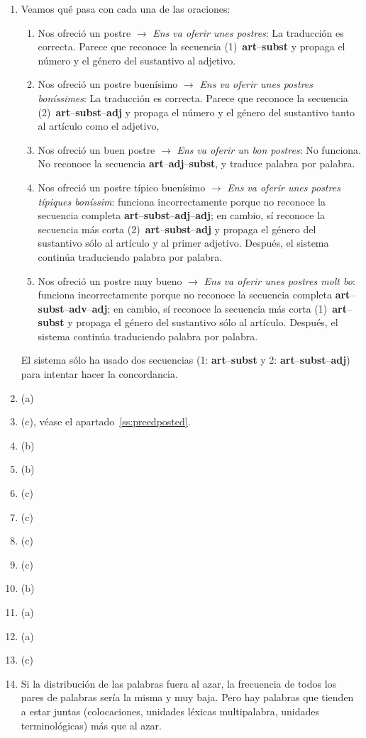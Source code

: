 \begin{enumerate}
\item Veamos qué pasa con cada una de las oraciones: \begin{enumerate} \item {\sf Nos ofreció un postre} $\rightarrow$ {\em Ens va oferir unes postres\/}: La traducción es correcta. Parece que reconoce la secuencia (1)~{\bf art}--{\bf subst} y propaga el número y el género del sustantivo al adjetivo. \item {\sf Nos ofreció un postre buenísimo} $\rightarrow$ {\em Ens va oferir unes postres boníssimes\/}: La traducción es correcta. Parece que reconoce la secuencia (2)~{\bf art}--{\bf subst}--{\bf adj} y propaga el número y el género del sustantivo tanto al artículo como el adjetivo, \item {\sf Nos ofreció un buen postre} $\rightarrow$ {\em *Ens va oferir un bon postres}: No funciona. No reconoce la secuencia {\bf art}--{\bf adj}--{\bf subst}, y traduce palabra por palabra. \item {\sf Nos ofreció un postre típico buenísimo\/} $\rightarrow$ {\em *Ens va oferir unes postres típiques boníssim}: funciona incorrectamente porque no reconoce la secuencia completa {\bf art}--{\bf subst}--{\bf adj}--{\bf adj}; en cambio, sí reconoce la secuencia más corta (2)~{\bf art}--{\bf subst}--{\bf adj} y propaga el género del sustantivo sólo al artículo y al primer adjetivo. Después, el sistema continúa traduciendo palabra por palabra. \item {\sf Nos ofreció un postre muy bueno} $\rightarrow$ {\em *Ens va oferir unes postres molt bo\/}: funciona incorrectamente porque no reconoce la secuencia completa {\bf art}--{\bf subst}--{\bf adv}--{\bf adj}; en cambio, sí reconoce la secuencia más corta (1)~{\bf art}--{\bf subst} y propaga el género del sustantivo sólo al artículo. Después, el sistema continúa traduciendo palabra por palabra. \end{enumerate} El sistema sólo ha usado dos secuencias (1: {\bf art}--{\bf subst} y 2: {\bf art}--{\bf subst}--{\bf adj}) para intentar hacer la concordancia. 

\item (a) \item (c), véase el apartado~\ref{ss:preedposted}. \item (b) \item (b) \item (c) \item (c) 

\item (c) \item (c) \item (b) \item (a) \item (a) \item (c) \item Si la distribución de las palabras fuera al azar, la frecuencia de todos los pares de palabras sería la misma y muy baja. Pero hay palabras que tienden a estar juntas (colocaciones, unidades léxicas multipalabra, unidades terminológicas) más que al azar. 


\end{enumerate}
